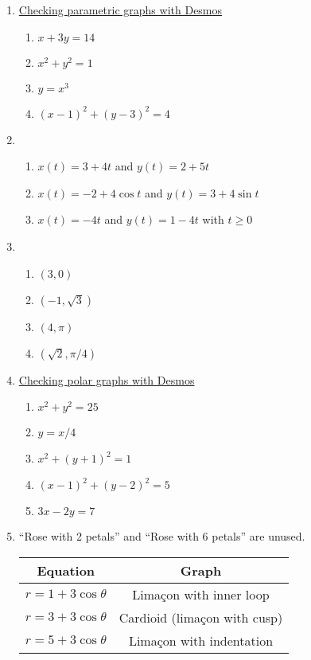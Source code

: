 \begin{enumerate}
\item \href{https://help.desmos.com/hc/en-us/articles/4406906208397-Parametric-Equations}{Checking parametric graphs with Desmos}
\begin{enumerate}
\item $x + 3y = 14$
\item $x^2 + y^2 = 1$
\item $y = x^3$
\item $(x - 1)^2 + (y - 3)^2 = 4$
\end{enumerate}
\item \begin{enumerate}
\item $x(t) = 3 + 4t$ and $y(t) = 2 + 5t$
\item $x(t) = -2 + 4\cos t$ and $y(t) = 3 + 4\sin t$
\item $x(t) = -4t$ and $y(t) = 1 - 4t$ with $t\geq 0$
\end{enumerate}
\item \begin{enumerate}
\item $(3,0)$
\item $(-1,\sqrt{3})$
\item $(4,\pi)$
\item $(\sqrt{2},\pi/4)$
\end{enumerate}
\item \href{https://help.desmos.com/hc/en-us/articles/4406895312781-Polar-Graphing}{Checking polar graphs with Desmos}
\begin{enumerate}
\item $x^2 + y^2 = 25$
\item $y = x/4$
\item $x^2 + (y + 1)^2 = 1$
\item $(x - 1)^2 + (y - 2)^2 = 5$
\item $3x - 2y = 7$
\end{enumerate}
\item ``Rose with 2 petals'' and ``Rose with 6 petals'' are unused.
\begin{table}[H]
\centering 
\begingroup\setlength{\tabcolsep}{40pt}
\begin{tabular}{cc}
Equation & Graph \\ \hline
$r = 1 + 3\cos\theta$ & Lima\c{c}on with inner loop \\
$r = 3 + 3\cos\theta$ & Cardioid (lima\c{c}on with cusp) \\
$r = 5 + 3\cos\theta$ & Lima\c{c}on with indentation \\

\end{tabular}
\end{table}
\end{enumerate}
